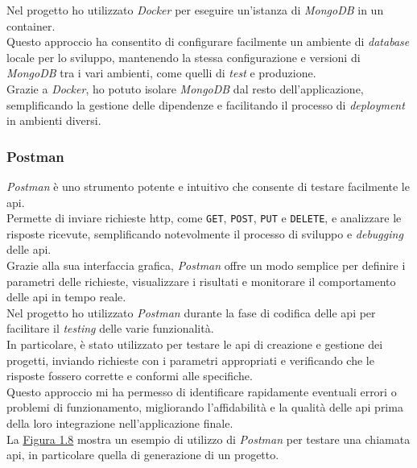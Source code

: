 \noindent Nel progetto ho utilizzato \textit{Docker} per eseguire un'istanza di \textit{MongoDB} in un \gls{container}.\\
Questo approccio ha consentito di configurare facilmente un ambiente di \textit{database} locale per lo sviluppo, mantenendo la stessa configurazione e versioni di \textit{MongoDB} tra i vari ambienti, come quelli di \textit{test} e produzione.\\
Grazie a \textit{Docker}, ho potuto isolare \textit{MongoDB} dal resto dell'applicazione, semplificando la gestione delle dipendenze e facilitando il processo di \textit{deployment} in ambienti diversi.

\subsubsection{Postman}

\textit{Postman} è uno strumento potente e intuitivo che consente di testare facilmente le \gls{api}.\\
Permette di inviare richieste \gls{http}, come \texttt{GET}, \texttt{POST}, \texttt{PUT} e \texttt{DELETE}, e analizzare le risposte ricevute, semplificando notevolmente il processo di sviluppo e \textit{debugging} delle \gls{api}.\\
Grazie alla sua interfaccia grafica, \textit{Postman} offre un modo semplice per definire i parametri delle richieste, visualizzare i risultati e monitorare il comportamento delle \gls{api} in tempo reale.\\

\noindent Nel progetto ho utilizzato \textit{Postman} durante la fase di codifica delle \gls{api} per facilitare il \textit{testing} delle varie funzionalità.\\
In particolare, è stato utilizzato per testare le \gls{api} di creazione e gestione dei progetti, inviando richieste con i parametri appropriati e verificando che le risposte fossero corrette e conformi alle specifiche.\\ 
Questo approccio mi ha permesso di identificare rapidamente eventuali errori o problemi di funzionamento, migliorando l'affidabilità e la qualità delle \gls{api} prima della loro integrazione nell'applicazione finale.\\

\noindent La {\hyperref[fig:postman]{Figura 1.8}} mostra un esempio di utilizzo di \textit{Postman} per testare una chiamata \gls{api}, in particolare quella di generazione di un progetto.

